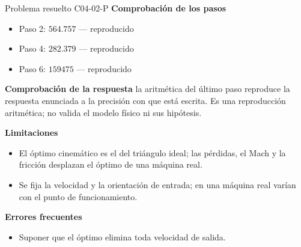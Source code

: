 \documentclass[10pt,openany]{book}
\begin{document}
\begin{studiumworked}{Problema resuelto C04-02-P}
\noindent\textbf{Comprobación de los pasos}
\begin{itemize}
\item Paso 2: $564.757$ — reproducido
\item Paso 4: $282.379$ — reproducido
\item Paso 6: $159475$ — reproducido
\end{itemize}

\noindent\textbf{Comprobación de la respuesta} la aritmética del último paso reproduce la respuesta enunciada a la precisión con que está escrita. Es una reproducción aritmética; no valida el modelo físico ni sus hipótesis.

\noindent\textbf{Limitaciones}
\begin{itemize}
\item El óptimo cinemático es el del triángulo ideal; las pérdidas, el Mach y la fricción desplazan el óptimo de una máquina real.
\item Se fija la velocidad y la orientación de entrada; en una máquina real varían con el punto de funcionamiento.
\end{itemize}

\noindent\textbf{Errores frecuentes}
\begin{itemize}
\item Suponer que el óptimo elimina toda velocidad de salida.
\end{itemize}
\end{studiumworked}
\end{document}
